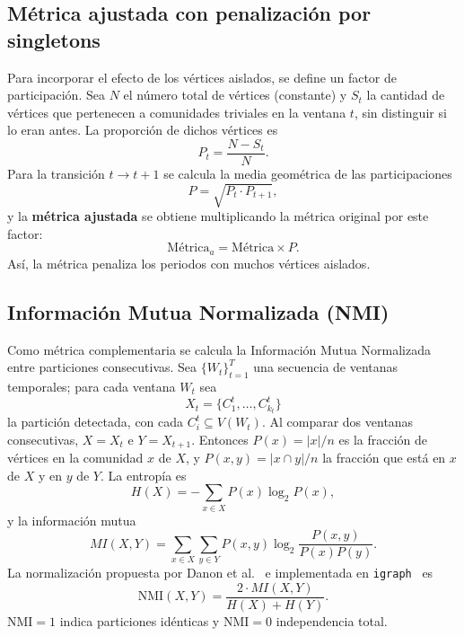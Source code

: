 \documentclass[12pt]{article}
\begin{document}
\subsection{Métrica ajustada con penalización por singletons}
Para incorporar el efecto de los vértices aislados, se define un factor de participación. Sea $N$ el número total de vértices (constante) y $S_t$ la cantidad de vértices que pertenecen a comunidades triviales en la ventana $t$, sin distinguir si lo eran antes. La proporción de dichos vértices es
\begin{equation}
P_t = \frac{N - S_t}{N}.
\end{equation}
Para la transición $t \to t+1$ se calcula la media geométrica de las participaciones
\begin{equation}
P = \sqrt{P_t \cdot P_{t+1}},
\end{equation}
y la \textbf{métrica ajustada} se obtiene multiplicando la métrica original por este factor:
\begin{equation}
\text{Métrica}_a = \text{Métrica} \times P.
\end{equation}
Así, la métrica penaliza los periodos con muchos vértices aislados.

\subsection{Información Mutua Normalizada (NMI)}
Como métrica complementaria se calcula la Información Mutua Normalizada entre particiones consecutivas. Sea $\{W_t\}_{t=1}^{T}$ una secuencia de ventanas temporales; para cada ventana $W_t$ sea
\[
X_t = \{C_1^t, \dots, C_{k_t}^t\}
\]
la partición detectada, con cada $C_i^t \subseteq V(W_t)$. Al comparar dos ventanas consecutivas, $X = X_t$ e $Y = X_{t+1}$. Entonces $P(x)=|x|/n$ es la fracción de vértices en la comunidad $x$ de $X$, y $P(x,y)=|x\cap y|/n$ la fracción que está en $x$ de $X$ y en $y$ de $Y$. La entropía es
\begin{equation}
H(X) = -\sum_{x \in X} P(x) \log_2 P(x),
\end{equation}
y la información mutua
\begin{equation}
MI(X,Y) = \sum_{x \in X} \sum_{y \in Y} P(x,y) \log_2 \frac{P(x,y)}{P(x)P(y)}.
\end{equation}
La normalización propuesta por Danon et al.~\cite{ref:danon} e implementada en \texttt{igraph}~\cite{ref:igraph} es
\begin{equation}
\text{NMI}(X,Y) = \frac{2 \cdot MI(X,Y)}{H(X) + H(Y)}.
\end{equation}
$\text{NMI}=1$ indica particiones idénticas y $\text{NMI}=0$ independencia total.
\end{document}
